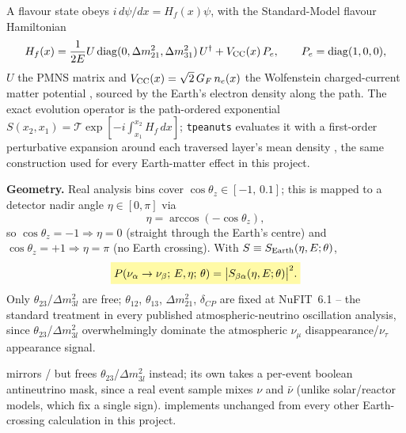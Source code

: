 \begin{theorybox}
A flavour state obeys $i\,d\psi/dx=H_f(x)\psi$, with the Standard-Model
flavour Hamiltonian
\begin{equation}
  H_f(x) = \frac{1}{2E}U\,{\rm diag}(0,\Delta m^2_{21},\Delta m^2_{31})\,U^\dagger
    + V_{\rm CC}(x)\,P_e, \qquad P_e={\rm diag}(1,0,0),
  \label{eq:flavour-hamiltonian}
\end{equation}
$U$ the PMNS matrix and $V_{\rm CC}(x)=\sqrt2\,G_F\,n_e(x)$ the Wolfenstein
charged-current matter potential \parencite{Wolfenstein1978}, sourced by
the Earth's electron density along the path. The exact evolution operator
is the path-ordered exponential
$S(x_2,x_1)=\mathcal T\exp[-i\int_{x_1}^{x_2}H_f\,dx]$; \texttt{tpeanuts}
evaluates it with a first-order perturbative expansion around each
traversed layer's mean density \parencite{Akhmedov2007Oscillograms}, the
same construction used for every Earth-matter effect in this project.

\textbf{Geometry.} Real analysis bins cover $\cos\theta_z\in[-1,\,0.1]$;
this is mapped to a detector nadir angle $\eta\in[0,\pi]$ via
\begin{equation}
  \eta = \arccos(-\cos\theta_z),
\end{equation}
so $\cos\theta_z=-1\Rightarrow\eta=0$ (straight through the Earth's centre)
and $\cos\theta_z=+1\Rightarrow\eta=\pi$ (no Earth crossing). With
$S\equiv S_{\rm Earth}(\eta,E;\theta)$,
\begin{equation}
  \keyresult{P(\nu_\alpha\to\nu_\beta;\,E,\eta;\,\theta) = \bigl|S_{\beta\alpha}(\eta,E;\theta)\bigr|^2.}
  \label{eq:transition-probability}
\end{equation}
Only $\theta_{23}$/$\Delta m^2_{3l}$ are free; $\theta_{12}$, $\theta_{13}$,
$\Delta m^2_{21}$, $\delta_{CP}$ are fixed at NuFIT~6.1
\parencite{EstebanNuFit2024} -- the standard treatment in every published
atmospheric-neutrino oscillation analysis, since $\theta_{23}$/$\Delta
m^2_{3l}$ overwhelmingly dominate the atmospheric $\nu_\mu$
disappearance/$\nu_\tau$ appearance signal.
\end{theorybox}

\begin{implbox}
 mirrors
/ but
frees $\theta_{23}$/$\Delta m^2_{3l}$ instead; its own
 takes a per-event boolean
antineutrino mask, since a real event sample mixes $\nu$ and $\bar\nu$
(unlike solar/reactor models, which fix a single sign).
 implements
 unchanged from every other
Earth-crossing calculation in this project.
\end{implbox}

